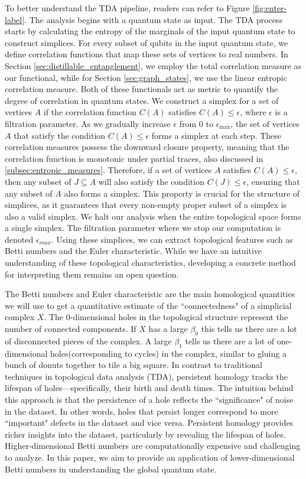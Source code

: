 \documentclass{article}
\begin{document}
To better understand the TDA pipeline, readers can refer to Figure \ref{fig:enter-label}. The analysis begins with a quantum state as input. The TDA process starts by calculating the entropy of the marginals of the input quantum state to construct simplices. For every subset of qubits in the input quantum state, we define correlation functions that map these sets of vertices to real numbers. In Section \ref{sec:distillable_entanglement}, we employ the total correlation measure as our functional, while for Section \ref{sec:graph_states}, we use the linear entropic correlation measure. Both of these functionals act as metric to quantify the degree of correlation in quantum states. We construct a simplex for a set of vertices $A$ if the correlation function $C(A)$ satisfies $C(A) \leq \epsilon$, where $\epsilon$ is a filtration parameter. As we gradually increase $\epsilon$ from 0 to $\epsilon_{\text{max}}$, the set of vertices $A$ that satisfy the condition $C(A) \leq \epsilon$ forms a simplex at each step. These correlation measures possess the downward closure property, meaning that the correlation function is monotonic under partial traces, also discussed in \ref{subsec:entropic_measures}. Therefore, if a set of vertices $A$ satisfies $C(A) \leq \epsilon$, then any subset of $J \subseteq A$ will also satisfy the condition $C(J) \leq \epsilon$, ensuring that any subset of $A$ also forms a simplex. This property is crucial for the structure of simplices, as it guarantees that every non-empty proper subset of a simplex is also a valid simplex. We halt our analysis when the entire topological space forms a single simplex. The filtration parameter where we stop our computation is denoted $\epsilon_{max}$. Using these simplices, we can extract topological features such as Betti numbers and the Euler characteristic. While we have an intuitive understanding of these topological characteristics, developing a concrete method for interpreting them remains an open question. 

The Betti numbers and Euler characteristic are the main homological quantities we will use to get a quantitative estimate of the ``connectedness" of a simplicial complex $X$. The $0$-dimensional holes in the topological structure represent the number of connected components. If $X$ has a large $\beta_0$ this tells us there are a lot of disconnected pieces of the complex. A large $\beta_1$ tells us there are a lot of one-dimensional holes(corresponding to cycles) in the complex, similar to gluing a bunch of donuts together to tile a big square.  In contrast to traditional techniques in topological data analysis (TDA), persistent homology tracks the lifespan of holes—specifically, their birth and death times. The intuition behind this approach is that the persistence of a hole reflects the ``significance" of noise in the dataset. In other words, holes that persist longer correspond to more ``important" defects in the dataset and vice versa. Persistent homology provides richer insights into the dataset, particularly by revealing the lifespan of holes. Higher-dimensional Betti numbers are computationally expensive and challenging to analyze. In this paper, we aim to provide an application of lower-dimensional Betti numbers in understanding the global quantum state.
\end{document}
